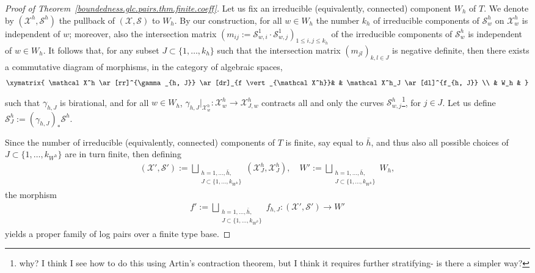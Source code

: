\documentclass[12pt, a4paper]{amsart}
\newcounter{Theorem}
\theoremstyle{definition}
\theoremstyle{named}
\begin{document}
\begin{proof}[Proof of Theorem~\ref{boundedness.glc.pairs.thm.finite.coeff}]
Let us fix an irreducible (equivalently,  connected) component
$W_h$
of 
$T$.
We denote by 
$(\mathcal X^h, \mathcal S^h)$
the pullback of 
$(\mathcal X, \mathcal S)$
to 
$W_h$.
By our construction, for all 
$w \in W_h$
the number 
$k_{h}$ 
of irreducible components of 
$\mathcal S^h_{w}$
on 
$\mathcal X^h_{w}$
is independent of 
$w$;
moreover, also the intersection matrix 
$(m_{ij}:=
\mathcal S^1_{w, i} \cdot \mathcal S^1_{w,  j})_
{1\leq i, j \leq k_{h}}$
of the irreducible components of 
$\mathcal S^h_w$ 
is independent of 
$w \in W_h$.
It follows that, for any subset 
$J \subset \{1, \dots, k_{h}\}$
such that the intersection matrix
$(m_{jl})_{k, l \in J}$
is negative definite, then there exists a commutative diagram of morphisms, in the category of algebraic spaces,
\begin{align*}
    \xymatrix{
\mathcal X^h \ar[rr]^{\gamma_{h, J}} \ar[dr]_{f \vert_{\mathcal X^h}}& & \mathcal X^h_J \ar[dl]^{f_{h, J}}
\\
& W_h &
    }
\end{align*}
such that 
$\gamma_{h, J}$
is birational, and for all 
$w \in W_h$, 
$\gamma_{h, J}\vert_{\mathcal X^h_w} \colon \mathcal X^h_w \to \mathcal X^h_{J, w}$
contracts all and only the curves 
$\mathcal S^h_{w, j}$\footnote{why? I think I see how to do this using Artin's contraction theorem, but I think it requires further stratifying- is there a simpler way?}, 
for 
$j \in J$.
Let us define 
$\mathcal S^h_J := (\gamma_{h, J})_\ast \mathcal S^h$.

Since the number of irreducible (equivalently, connected) components of 
$T$
is finite, say equal to $\bar{h}$,
and thus also all possible choices of 
$J \subset \{1, \dots, k_{W^h}\}$
are in turn finite, then defining
\begin{align*}
    (\mathcal X', \mathcal S'):=
\bigsqcup_{\substack{h=1, \dots, \bar h,
\\J \subset \{1, \dots, k_{W^h}\}}}
(\mathcal X^h_J, \mathcal X^h_J), 
\quad 
W':=
\bigsqcup_{\substack{h=1, \dots, \bar h,
\\J \subset \{1, \dots, k_{W^h}\}}}
W_h, 
\end{align*}
the morphism 
\begin{align*}
f':= 
\bigsqcup_{\substack{h=1, \dots, \bar h,
\\J \subset \{1, \dots, k_{W^h}\}}} 
f_{h, J} 
\colon 
(\mathcal X', \mathcal S')
\to
W'
\end{align*}
yields a proper family of log pairs over a finite type base.



\end{proof}
\end{document}
